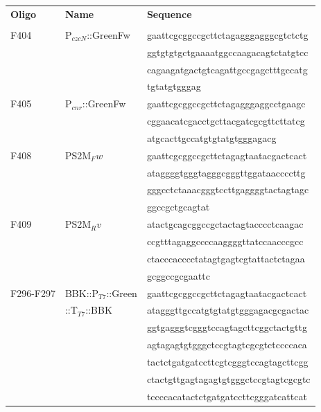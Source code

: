 \newpage
\makeatletter
\setlength{\@fptop}{0pt}
\makeatother
\begin{table}[ht!]
\label{table:332}
{%
\begin{tabular*}{\columnwidth}{@{}lll@{}}
\hline
\textbf{Oligo} & \textbf{Name} & \textbf{Sequence}
\\
\\
\hline
F404 & 	P$_{czcN}$::GreenFw & \MakeLowercase{GAATTCGCGGCCGCTTCTAGAGggagggcgtctctg}
\\
&  &  \MakeLowercase{ggtgtgtgctgaaaatggccaagacagtctatgtcc}
\\
&  &  \MakeLowercase{cagaagatgactgtcagattgccgagctTTGCCATG}
\\
&  &  \MakeLowercase{TGTATGTGGGAG}
\\
F405 & P$_{cnr}$::GreenFw & \MakeLowercase{GAATTCGCGGCCGCTTCTAGAGggaggcctgaagc}
\\
& & \MakeLowercase{cggaacatcgacctgcttacgatcgcgttcttatcg}
\\
& & \MakeLowercase{atgcacTTGCCATGTGTATGTGGGAGACG}
\\
F408 & PS2M$_Fw$ & \MakeLowercase{gaattcgcggccgcttCTAGAGTAATACGACTCACT}
\\
&  &  \MakeLowercase{ATAGGGGTGGGTAGGGCGGGTTGGATAACCCCTTG}
\\
&  &  \MakeLowercase{GGGCCTCTAAACGGGTCCTTGAGGGGtactagtagc}
\\
& & \MakeLowercase{ggccgctgcagTAT}
\\
F409 & PS2M$_Rv$ & \MakeLowercase{ATActgcagcggccgctactagtaCCCCTCAAGAC}
\\
& & \MakeLowercase{CCGTTTAGAGGCCCCAAGGGGTTATCCAACCCGCC}
\\
& & \MakeLowercase{CTACCCACCCCTATAGTGAGTCGTATTACTCTAGaa}
\\
& & \MakeLowercase{gcggccgcgaattc}
\\
F296-F297 & BBK::P$_{T7}$::Green & \MakeLowercase{gaattcgcggccgcttCTAGAGTAATACGACTCACT}
\\
& ::T$_{T7}$::BBK& \MakeLowercase{ATAGGGTTGCCATGTGTATGTGGGAGACGCGACTAC}
\\
& & \MakeLowercase{GGTGAGGGTCGGGTCCAGTAGCTTCGGCTACTGTTG}
\\
& & \MakeLowercase{AGTAGAGTGTGGGCTCCGTAGTCGCGTCTCCCCACA}
\\
&  & \MakeLowercase{TACTCTGATGATCCTTCGTCGGGTCCAGTAGCTTCGG}
\\
&  & \MakeLowercase{CTACTGTTGAGTAGAGTGTGGGCTCCGTAGTCGCGTC}
\\
& & \MakeLowercase{TCCCCACATACTCTGATGATCCTTCGGGATCATTCAT}

\end{tabular*}}
\end{table}
